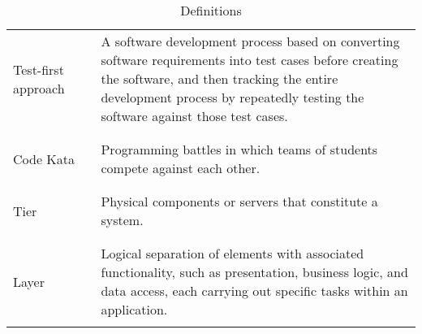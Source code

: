 \begin{table}[H]
\begin{tabular}{l l p{10cm}}
        Test-first approach & \vline & A software development process based on converting software requirements into test cases before creating the software,
                                       and then tracking the entire development process by repeatedly testing the software against those test cases.          \\
                            &        &                                                                                                                        \\\hline \\
        Code Kata           & \vline & Programming battles in which teams of students compete against each other.                                             \\
                            &        &                                                                                                                        \\\hline \\
        Tier                & \vline & Physical components or servers that constitute a system.                                                               \\
                            &        &                                                                                                                        \\\hline \\
        Layer               & \vline & Logical separation of elements with associated functionality, such as presentation, business logic, and data access, 
                                       each carrying out specific tasks within an application.                                                                \\
                            &        &                                                                                                                        \\
        \hline
    \end{tabular}
    \caption{Definitions}
\end{table}

